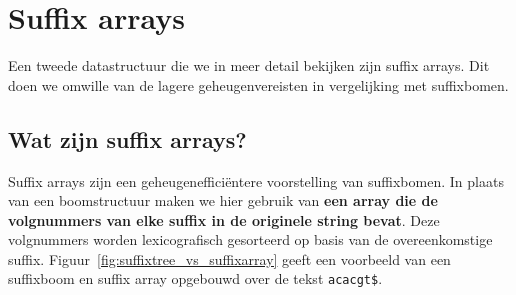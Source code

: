 \chapter{Suffix arrays}\label{ch:suffix-arrays}
Een tweede datastructuur die we in meer detail bekijken zijn suffix arrays.
Dit doen we omwille van de lagere geheugenvereisten in vergelijking met suffixbomen.

\section{Wat zijn suffix arrays?}\label{sec:wat-zijn-suffix-arrays?}
Suffix arrays zijn een geheugenefficiëntere voorstelling van suffixbomen.
In plaats van een boomstructuur maken we hier gebruik van \textbf{een array die de volgnummers van elke suffix in de originele string bevat}.
Deze volgnummers worden lexicografisch gesorteerd op basis van de overeenkomstige suffix.
Figuur~\ref{fig:suffixtree_vs_suffixarray} geeft een voorbeeld van een suffixboom en suffix array opgebouwd over de tekst \texttt{acacgt\$}.

